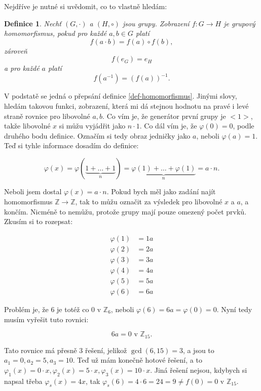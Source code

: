 \documentclass{article}
\newtheorem{definice}{Definice}[section]
\begin{document}
Nejdříve je nutné si uvědomit, co to vlastně hledám:

\begin{definice}
Nechť $(G, \cdot)$ a $(H, \circ)$ jsou grupy. Zobrazení $f: G \rightarrow H$ je grupový homomorfismus, pokud pro každé $a, b \in G$ platí
\[ f(a\cdot b) = f(a) \circ f(b),\]
zároveň 
\[ f(e_G) = e_H \]
a pro každé $a$ platí 
\[ f (a^{-1}) = (f(a))^{-1}. \]
\end{definice}

V podstatě se jedná o přepsání definice \ref{def-homomorfismus}. Jinými slovy, hledám takovou funkci, zobrazení, která mi dá stejnou hodnotu na pravé i levé straně rovnice pro libovolné $a,b$. Co vím je, že generátor první grupy je ${<}1{>}$, takže libovolné $x$ si můžu vyjádřit jako $n\cdot1$. Co dál vím je, že $\varphi(0) = 0$, podle druhého bodu definice. Označím si tedy obraz jedničky jako $a$, neboli $\varphi(a)=1$. Teď si tyhle informace dosadím do definice:

\[ \varphi(x) = \varphi(\underbrace{1+\ldots+1}_{n}) = \underbrace{\varphi(1) + \ldots + \varphi(1)}_{n} = 
 a\cdot n. \]
 
 Neboli jsem dostal $\varphi(x) = a\cdot n$. Pokud bych měl jako zadání najít homomorfismus $\mathbb{Z} \rightarrow \mathbb{Z}$, tak to můžu označit za výsledek pro libovolné $x$ a $a$, a končím. Nicméně to nemůžu, protože grupy mají pouze omezený počet prvků. Zkusím si to rozepsat:  

\begin{align*}
\varphi(1) & = 1a\\
\varphi(2) & = 2a\\
\varphi(3) & = 3a\\
\varphi(4) & = 4a\\
\varphi(5) & = 5a\\
\varphi(6) & = 6a
\end{align*}

Problém je, že 6 je totéž co 0 v $\mathbb{Z}_6$, neboli $\varphi(6) = 6a = \varphi(0) = 0$. Nyní tedy musím vyřešit tuto rovnici:

\[ 6a = 0 \text{ v } \mathbb{Z}_{15}. \]

Tato rovnice má přesně 3 řešení, jelikož $\gcd(6,15) = 3$, a jsou to $a_1 = 0, a_2 = 5, a_3 = 10$. Teď už mám konečně hotové řešení, a to $\varphi_1(x) = 0\cdot x, \varphi_2(x) = 5 \cdot x, \varphi_3(x) = 10\cdot x$. Jiná řešení nejsou, kdybych si napsal třeba $\varphi_s(x)=4x$, tak $\varphi_s(6) = 4\cdot6 = 24 = 9 \neq f(0) = 0$ v $\mathbb{Z}_{15}$.
\end{document}
